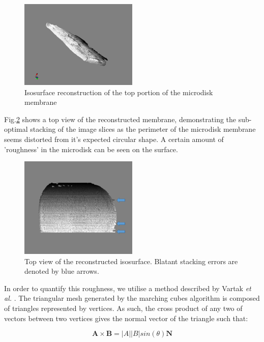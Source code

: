 \begin{figure}[h]
	\centering
	\includegraphics[width=0.5\textwidth]{Figs/Ch4/membrane.png}
	\caption {Isosurface reconstruction of the top portion of the microdisk membrane}
	\label{mayavi1}
\end{figure}
\FloatBarrier 

Fig.\ref{mayavi2} shows a top view of the reconstructed membrane, demonstrating the sub-optimal stacking of the image slices as the perimeter of the microdisk membrane seems distorted from it's expected circular shape. A certain amount of 'roughness' in the microdisk can be seen on the surface.

\begin{figure}[h]
	\centering
	\includegraphics[width=0.5\textwidth]{Figs/Ch4/udisktomoarrowstop.png}
	\caption {Top view of the reconstructed isosurface. Blatant stacking errors are denoted by blue arrows.}
	\label{mayavi2}
\end{figure}
\FloatBarrier

In order to quantify this roughness, we utilise a method described by Vartak \textit{et al.} \cite{Vartak2016}. The triangular mesh generated by the marching cubes algorithm is composed of triangles represented by vertices. As such, the cross product of any two of vectors between two vertices gives the normal vector of the triangle such that:

\begin{equation}
\textbf{A} \times \textbf{B} = |A||B|sin(\theta)\textbf{N}
\end{equation}

